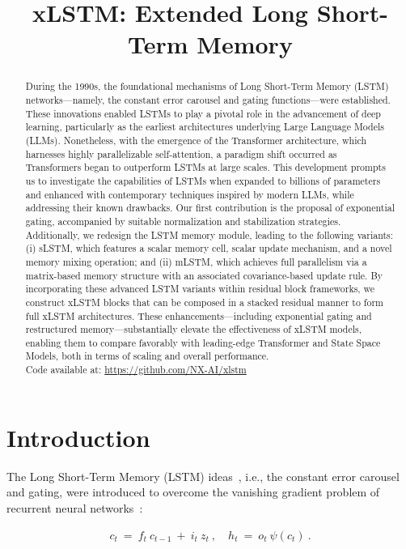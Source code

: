 \title{xLSTM: Extended Long Short-Term Memory}

\begin{abstract}
During the 1990s, the foundational mechanisms of Long Short-Term Memory (LSTM) networks—namely, the constant error carousel and gating functions—were established. These innovations enabled LSTMs to play a pivotal role in the advancement of deep learning, particularly as the earliest architectures underlying Large Language Models (LLMs). Nonetheless, with the emergence of the Transformer architecture, which harnesses highly parallelizable self-attention, a paradigm shift occurred as Transformers began to outperform LSTMs at large scales. This development prompts us to investigate the capabilities of LSTMs when expanded to billions of parameters and enhanced with contemporary techniques inspired by modern LLMs, while addressing their known drawbacks. Our first contribution is the proposal of exponential gating, accompanied by suitable normalization and stabilization strategies. Additionally, we redesign the LSTM memory module, leading to the following variants: (i) sLSTM, which features a scalar memory cell, scalar update mechanism, and a novel memory mixing operation; and (ii) mLSTM, which achieves full parallelism via a matrix-based memory structure with an associated covariance-based update rule. By incorporating these advanced LSTM variants within residual block frameworks, we construct xLSTM blocks that can be composed in a stacked residual manner to form full xLSTM architectures. These enhancements—including exponential gating and restructured memory—substantially elevate the effectiveness of xLSTM models, enabling them to compare favorably with leading-edge Transformer and State Space Models, both in terms of scaling and overall performance.\\
Code available at: \url{https://github.com/NX-AI/xlstm}
\end{abstract}

\section{Introduction}
\label{sec:intro}

The Long Short-Term Memory (LSTM) ideas~\citep{Hochreiter:91,Hochreiter:97nips,Hochreiter:97}, i.e., the constant error carousel and gating, were introduced to overcome the vanishing gradient problem of recurrent neural networks~\citep{Hochreiter:91,Hochreiter:00book}:

\begin{align}
\label{eq:lstm_idea}
  c_t \ = \ f_t \ c_{t-1} \ + \ 
          i_t \  z_t \ , \quad  
          h_t \ = \ o_t \ \psi({c_t}) \ . 
\end{align}

